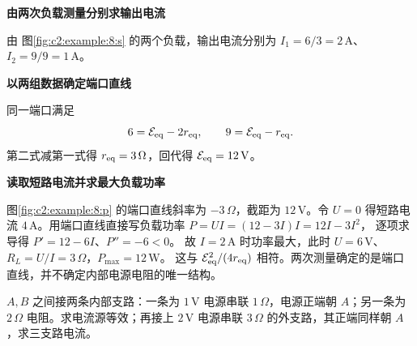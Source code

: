 \begin{solution}\textbf{由两次负载测量分别求输出电流}\par\nobreak
由 图\ref{fig:c2:example:8:s} 的两个负载，输出电流分别为 $I_1=6/3=2\,\mathrm A$、$I_2=9/9=1\,\mathrm A$。

\par\medskip{}\noindent\textbf{以两组数据确定端口直线}\par\nobreak
同一端口满足
\[
 6=\mathcal E_{\rm eq}-2r_{\rm eq},\qquad
 9=\mathcal E_{\rm eq}-r_{\rm eq}.
\]
第二式减第一式得 $r_{\rm eq}=3\,\Omega$，回代得 $\mathcal E_{\rm eq}=12\,\mathrm V$。



\par\medskip{}\noindent\textbf{读取短路电流并求最大负载功率}\par\nobreak
图\ref{fig:c2:example:8:p} 的端口直线斜率为 $-3\,\Omega$，截距为 $12\,\mathrm V$。令 $U=0$ 得短路电流 $4\,\mathrm A$。用端口直线直接写负载功率
$P=UI=(12-3I)I=12I-3I^2$，
逐项求导得 $P'=12-6I$、$P''=-6<0$。
故 $I=2\,\mathrm A$ 时功率最大，此时 $U=6\,\mathrm V$、
$R_L=U/I=3\,\Omega$，$P_{\max}=12\,\mathrm W$。
这与 $\mathcal E_{\rm eq}^2/(4r_{\rm eq})$ 相符。两次测量确定的是端口直线，并不确定内部电源电阻的唯一结构。\end{solution}
\begin{question}\begin{example}[两端网络的等效电流源]\label{c2:example:9}
$A,B$ 之间接两条内部支路：一条为 $1\,\mathrm V$ 电源串联 $1\,\Omega$，电源正端朝 $A$；另一条为 $2\,\Omega$ 电阻。求电流源等效；再接上 $2\,\mathrm V$ 电源串联 $3\,\Omega$ 的外支路，其正端同样朝 $A$，求三支路电流。
\end{example}
\end{question}

